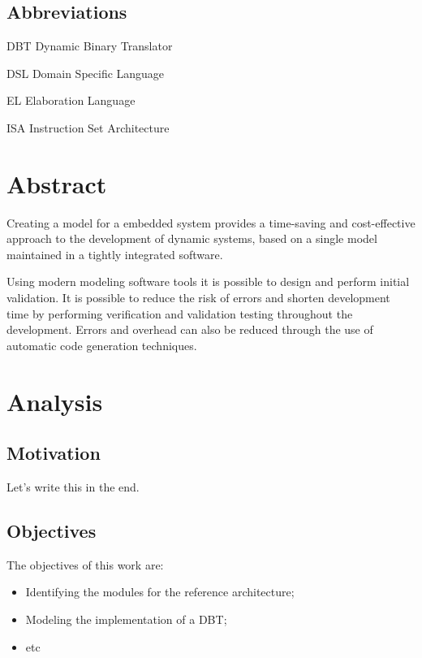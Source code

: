 \documentclass{report}
\newenvironment{abbreviations}{\begin{list}{}{\renewcommand{\makelabel}{\abbrlabel}}}{\end{list}}
\newcommand{\abbrlabel}[1]{\makebox[3cm][l]{\textbf{#1}\ \dotfill}}
\begin{document}
\section*{Abbreviations}
\begin{abbreviations} 
	\item[DBT] Dynamic Binary Translator
	\item[DSL] Domain Specific Language
	\item[EL] Elaboration Language
	\item[ISA] Instruction Set Architecture
\end{abbreviations}
\newpage
\chapter{Abstract}

\par Creating a model for a embedded system provides a time-saving and cost-effective approach to the development of dynamic systems, based on a single model maintained in a tightly integrated software. 
\par Using modern modeling software tools it is possible to design and perform initial validation. It is possible to reduce the risk of errors and shorten development time by performing verification and validation testing throughout the development. Errors and overhead can also be reduced through the use of automatic code generation techniques\cite{modelling-embsys}.
\chapter{Analysis}

	\section{Motivation}
	
	\par Let's write this in the end.

	\section{Objectives}
	
	\par The objectives of this work are:
	\begin{itemize}
		\item Identifying the modules for the reference architecture;
		\item Modeling the implementation of a DBT;
		\item etc
	\end{itemize}
\end{document}
